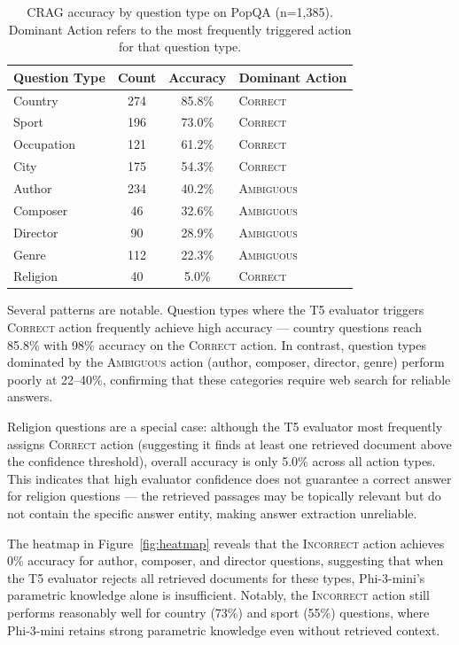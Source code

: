 \documentclass[11pt]{article}
\begin{document}
\begin{table}[H]
\centering
\begin{tabular}{lccl}
\toprule
\textbf{Question Type} & \textbf{Count} & \textbf{Accuracy} & \textbf{Dominant Action} \\
\midrule
Country    & 274 & 85.8\% & \textsc{Correct}   \\
Sport      & 196 & 73.0\% & \textsc{Correct}   \\
Occupation & 121 & 61.2\% & \textsc{Correct}   \\
City       & 175 & 54.3\% & \textsc{Correct}   \\
Author     & 234 & 40.2\% & \textsc{Ambiguous} \\
Composer   &  46 & 32.6\% & \textsc{Ambiguous} \\
Director   &  90 & 28.9\% & \textsc{Ambiguous} \\
Genre      & 112 & 22.3\% & \textsc{Ambiguous} \\
Religion   &  40 &  5.0\% & \textsc{Correct}   \\
\bottomrule
\end{tabular}
\caption{CRAG accuracy by question type on PopQA (n=1,385). Dominant Action refers to the most
frequently triggered action for that question type.}
\label{tab:error}
\end{table}

Several patterns are notable. Question types where the T5 evaluator triggers \textsc{Correct}
action frequently achieve high accuracy --- country questions reach 85.8\% with 98\% accuracy on
the \textsc{Correct} action. In contrast, question types dominated by the \textsc{Ambiguous}
action (author, composer, director, genre) perform poorly at 22--40\%, confirming that these
categories require web search for reliable answers.

Religion questions are a special case: although the T5 evaluator most frequently assigns
\textsc{Correct} action (suggesting it finds at least one retrieved document above the confidence
threshold), overall accuracy is only 5.0\% across all action types. This indicates that high
evaluator confidence does not guarantee a correct answer for religion questions --- the retrieved
passages may be topically relevant but do not contain the specific answer entity, making answer
extraction unreliable.

The heatmap in Figure~\ref{fig:heatmap} reveals that the \textsc{Incorrect} action achieves 0\%
accuracy for author, composer, and director questions, suggesting that when the T5 evaluator
rejects all retrieved documents for these types, Phi-3-mini's parametric knowledge alone is
insufficient. Notably, the \textsc{Incorrect} action still performs reasonably well for country
(73\%) and sport (55\%) questions, where Phi-3-mini retains strong parametric knowledge even
without retrieved context.
\end{document}
